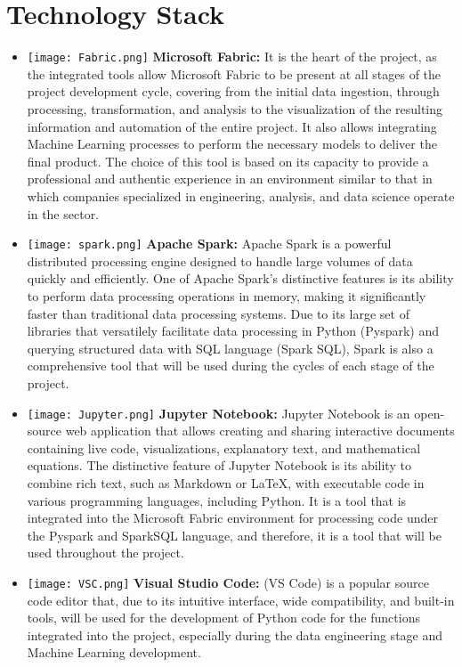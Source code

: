 \documentclass[12pt]{article}
\begin{document}
\section{Technology Stack}
\begin{itemize}
    \item \texttt{[image: Fabric.png]}
    \textbf{Microsoft Fabric:} It is the heart of the project, as the integrated tools allow Microsoft Fabric to be present at all stages of the project development cycle, covering from the initial data ingestion, through processing, transformation, and analysis to the visualization of the resulting information and automation of the entire project. It also allows integrating Machine Learning processes to perform the necessary models to deliver the final product. The choice of this tool is based on its capacity to provide a professional and authentic experience in an environment similar to that in which companies specialized in engineering, analysis, and data science operate in the sector.
    
    \item \texttt{[image: spark.png]}
    \textbf{Apache Spark:} Apache Spark is a powerful distributed processing engine designed to handle large volumes of data quickly and efficiently. One of Apache Spark's distinctive features is its ability to perform data processing operations in memory, making it significantly faster than traditional data processing systems. Due to its large set of libraries that versatilely facilitate data processing in Python (Pyspark) and querying structured data with SQL language (Spark SQL), Spark is also a comprehensive tool that will be used during the cycles of each stage of the project.
    
    \item \texttt{[image: Jupyter.png]}
    \textbf{Jupyter Notebook:} Jupyter Notebook is an open-source web application that allows creating and sharing interactive documents containing live code, visualizations, explanatory text, and mathematical equations.
    The distinctive feature of Jupyter Notebook is its ability to combine rich text, such as Markdown or LaTeX, with executable code in various programming languages, including Python. It is a tool that is integrated into the Microsoft Fabric environment for processing code under the Pyspark and SparkSQL language, and therefore, it is a tool that will be used throughout the project.
    
    \item \texttt{[image: VSC.png]}
    \textbf{Visual Studio Code:} (VS Code) is a popular source code editor that, due to its intuitive interface, wide compatibility, and built-in tools, will be used for the development of Python code for the functions integrated into the project, especially during the data engineering stage and Machine Learning development.
    

\end{itemize}
\end{document}
